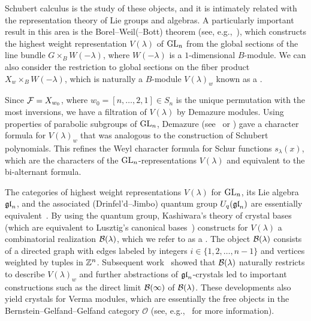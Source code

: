 \documentclass[11pt]{article}
\begin{document}
Schubert calculus is the study of these objects, and it is intimately related with the representation theory of Lie groups and algebras.
A particularly important result in this area is the Borel--Weil(--Bott) theorem (see, e.g.,~\cite[\S23.3]{FH91}), which constructs the highest weight representation $V(\lambda)$ of $\mathrm{GL}_n$ from the global sections of the line bundle $G \times_B W(-\lambda)$, where $W(-\lambda)$ is a $1$-dimensional $B$-module.
We can also consider the restriction to global sections on the fiber product $X_w \times_B W(-\lambda)$, which is naturally a $B$-module $V(\lambda)_w$ known as a .

Since $\mathcal{F} = X_{w_0}$, where $w_0 = [n, \dotsc, 2, 1] \in S_n$ is the unique permutation with the most inversions, we have a filtration of $V(\lambda)$ by Demazure modules.
Using properties of parabolic subgroups of $\mathrm{GL}_n$, Demazure (see~\cite{Andersen85} or \cite{LMS79}) gave a character formula for $V(\lambda)_w$ 
that was analogous to the construction of Schubert polynomials.
This  refines the Weyl character formula for Schur functions $s_{\lambda}(x)$, which are the characters of the $\mathrm{GL}_n$-representations $V(\lambda)$ and equivalent to the bi-alternant formula.

The categories of highest weight representations $V(\lambda)$ for $\mathrm{GL}_n$,  its Lie algebra $\mathfrak{gl}_n$, and the associated (Drinfel'd--Jimbo) quantum group $U_q(\mathfrak{gl}_n)$ are essentially equivalent~\cite{Bourbaki98,Joseph95}.
By using the quantum group, Kashiwara's theory of crystal bases~\cite{Kashiwara90,Kashiwara91} (which are equivalent to Lusztig's canonical bases~\cite{Lusztig90,Lusztig91,GL93}) constructs for $V(\lambda)$ a combinatorial realization $\mathcal{B}(\lambda)$, which we refer to as a .
The object $\mathcal{B}(\lambda)$ consists of a directed graph with edges labeled by integers $i\in\{1,2,\dots,n-1\}$ and vertices weighted by tuples in $\mathbb{Z}^n$.
Subsequent work~\cite{Kashiwara93,Littelmann95} showed that $\mathcal{B}(\lambda)$ naturally restricts to describe $V(\lambda)_w$ 
and further abstractions of $\mathfrak{gl}_n$-crystals led to important constructions such as the direct limit $\mathcal{B}(\infty)$ of $\mathcal{B}(\lambda)$.
These developments also yield crystals for Verma modules, which are essentially the free objects in the Bernstein--Gelfand--Gelfand category $\mathcal{O}$ (see, e.g.,~\cite{Humphreys08} for more information).
\end{document}
